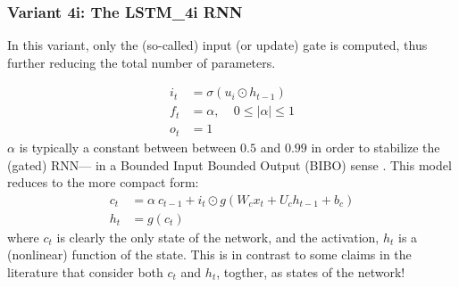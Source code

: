 \documentclass{article}
\begin{document}
\subsubsection{Variant 4i: The LSTM\_4i RNN}
In this variant, only the (so-called) input (or update) gate is computed, thus further reducing the total number of parameters.

\begin{align}
	i_t &= \sigma(u_i \odot  h_{t-1} )\\
	f_t &= \alpha,  ~~~~~ 0 \leq  | \alpha | \leq  1 \\
	o_t &= 1
\end{align}
$\alpha$ is typically a constant between between $0.5$ and $0.99$ in order to stabilize the (gated) RNN--- in a Bounded Input Bounded Output (BIBO) sense \cite{salem2016basic}.
This model reduces to the more compact form:
\begin{align}
	\label{eqn:4431}	 c_t &=  \alpha ~ c_{t-1} + i_t \odot g(W_c x_t + U_c h_{t-1} + b_c)\\
	\label{eqn:4441}	h_t &=  g(c_t)
\end{align}
where $c_t$ is clearly the only state of the network, and the activation, $h_t$ is a (nonlinear) function of the state. This is in contrast to some claims in the literature that consider both $c_t$ and $h_t$, togther, as states of the network!
\end{document}
